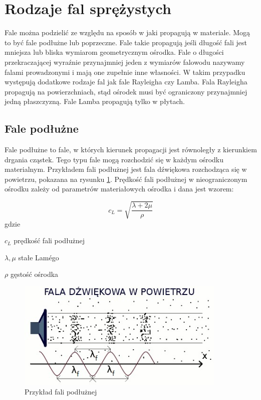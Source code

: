 
\section{Rodzaje fal sprężystych}
\label{sec:rodzaje_fal_sprezystych}

Fale można podzielić ze względu na sposób w jaki propagują w materiale. Mogą to być fale podłużne lub poprzeczne. Fale takie propagują jeśli długość fali jest mniejsza lub bliska wymiarom geometrycznym ośrodka. Fale o długości przekraczającej wyraźnie przynajmniej jeden z wymiarów falowodu nazywamy falami prowadzonymi i mają one zupełnie inne własności. W takim przypadku występują dodatkowe rodzaje fal jak fale Rayleigha czy Lamba. Fala Rayleigha propagują na powierzchniach, stąd ośrodek musi być ograniczony przynajmniej jedną płaszczyzną. Fale Lamba propagują tylko w płytach.

\subsection{Fale podłużne}

Fale podłużne to fale, w których kierunek propagacji jest równoległy z kierunkiem drgania cząstek. Tego typu fale mogą rozchodzić się w każdym ośrodku materialnym. Przykładem fali podłużnej jest fala dźwiękowa rozchodząca się w powietrzu, pokazana na rysunku \ref{fig:fala_podluzna}. Prędkość fali podłużnej w nieograniczonym ośrodku zależy od parametrów materiałowych ośrodka i dana jest wzorem:

\begin{equation}
c_L=\sqrt{\frac{\lambda+2\mu}{\rho}}
\end{equation}
gdzie
\begin{eqwhere}[2cm]
        \item[$c_L$] prędkość fali podłużnej
        \item[$\lambda, \mu$] stałe Lam\'{e}go
        \item[$\rho$] gęstość ośrodka
\end{eqwhere}

\begin{figure}[h]
\centering
\includegraphics[width=10cm]{Zdjecia/2/fala_podluzna}
\caption{Przykład fali podłużnej \cite{bartek_fala_podluzna}}
\label{fig:fala_podluzna}
\end{figure}

